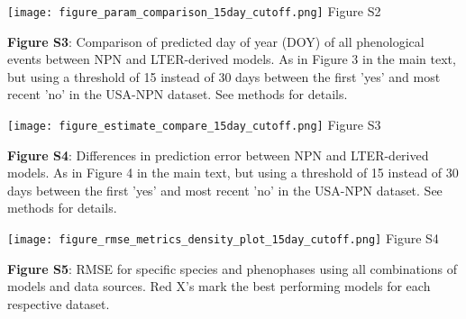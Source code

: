 \documentclass[a4paper,12pt]{article}
\begin{document}
\newpage

\begin{center}
	\centering
		\texttt{[image: figure\_param\_comparison\_15day\_cutoff.png]}
	Figure S2
\end{center}

\newpage

\newpage

\textbf{Figure S3}: Comparison of predicted day of year (DOY) of all phenological events between NPN
and LTER-derived models. As in Figure 3 in the main text, but using a threshold of 15 instead of 30 days between the first 'yes' and most recent 'no' in the USA-NPN dataset. See methods for details. 

\newpage

\begin{center}
	\centering
		\texttt{[image: figure\_estimate\_compare\_15day\_cutoff.png]}
	Figure S3
\end{center}

\newpage

\newpage

\textbf{Figure S4}: Differences in prediction error between NPN and LTER-derived models. As in Figure 4 in the main text, but using a threshold of 15 instead of 30 days between the first 'yes' and most recent 'no' in the USA-NPN dataset. See methods for details. 

\newpage

\begin{center}
	\centering
		\texttt{[image: figure\_rmse\_metrics\_density\_plot\_15day\_cutoff.png]}
	Figure S4
\end{center}

\newpage

\newpage

\textbf{Figure S5}: RMSE for specific species and phenophases using all combinations of models and data sources. Red X's mark the best performing models for each respective dataset. 

\newpage
\end{document}
